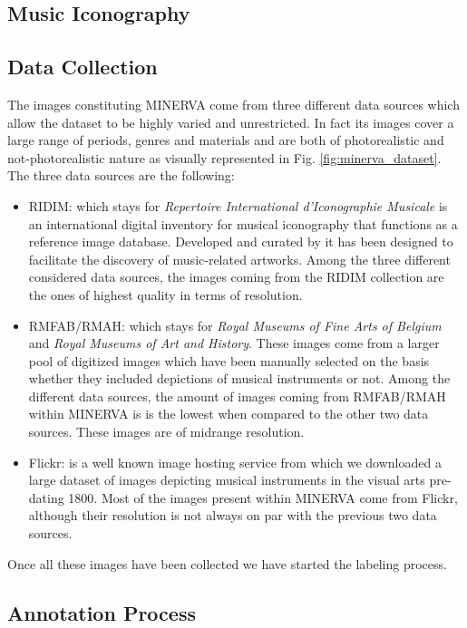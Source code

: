 \subsection{Music Iconography}


\subsection{Data Collection}
The images constituting MINERVA come from three different data sources which allow the dataset to be highly varied and unrestricted. In fact its images cover a large range of periods, genres and materials and are both of photorealistic and not-photorealistic nature as visually represented in Fig. \ref{fig:minerva_dataset}. The three data sources are the following:
\begin{itemize}
	\item RIDIM: which stays for \textit{Repertoire International d'Iconographie Musicale} is an international digital inventory for musical iconography that functions as a reference image database. Developed and curated by \citet{} it has been designed to facilitate the discovery of music-related artworks. Among the three different considered data sources, the images coming from the RIDIM collection are the ones of highest quality in terms of resolution.
	\item RMFAB/RMAH: which stays for \textit{Royal Museums of Fine Arts of Belgium} and \textit{Royal Museums of Art and History}. These images come from a larger pool of digitized images which have been manually selected on the basis whether they included depictions of musical instruments or not. Among the different data sources, the amount of images coming from RMFAB/RMAH within MINERVA is is the lowest when compared to the other two data sources. These images are of midrange resolution.
	\item Flickr: is a well known image hosting service from which we downloaded a large dataset of images depicting musical instruments in the visual arts pre-dating 1800. Most of the images present within MINERVA come from Flickr, although their resolution is not always on par with the previous two data sources.  
\end{itemize}

Once all these images have been collected we have started the labeling process.

\subsection{Annotation Process}
